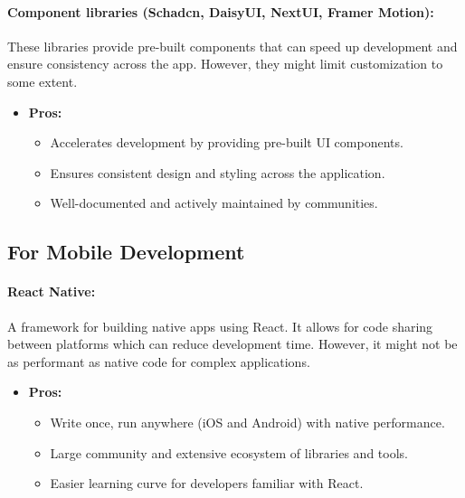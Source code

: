 \documentclass[11pt,a4paper]{article}
\begin{document}
\paragraph{Component libraries (Schadcn, DaisyUI, NextUI, Framer Motion):} These libraries provide pre-built components that can speed up development and ensure consistency across the app. However, they might limit customization to some extent.
\begin{itemize}
    \item \textbf{Pros:}
          \begin{itemize}
              \item Accelerates development by providing pre-built UI components.
              \item Ensures consistent design and styling across the application.
              \item Well-documented and actively maintained by communities.
          \end{itemize}
\end{itemize}

\subsection*{For Mobile Development}
\paragraph{React Native:} A framework for building native apps using React. It allows for code sharing between platforms which can reduce development time. However, it might not be as performant as native code for complex applications.
\begin{itemize}
    \item \textbf{Pros:}
          \begin{itemize}
              \item Write once, run anywhere (iOS and Android) with native performance.
              \item Large community and extensive ecosystem of libraries and tools.
              \item Easier learning curve for developers familiar with React.
          \end{itemize}
\end{itemize}
\end{document}
